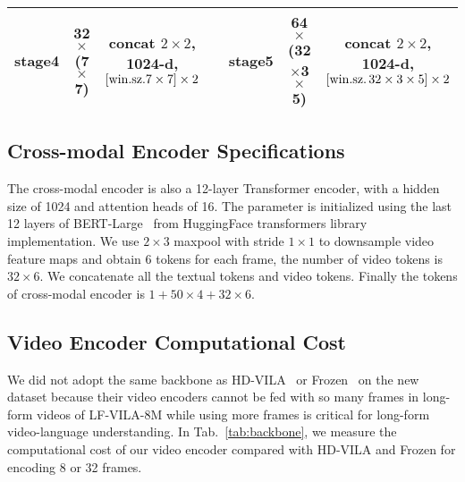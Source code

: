 \documentclass{article}
\begin{document}
\begin{table}[t]
\begin{tabular}{c c c c c c c}
    \cmidrule{1-7}
    
    stage4 &\makecell[c]{32$\times$\\(7$\times$7)} &\makecell[c]{concat $2\times2$, \\1024-d, \\ $[\rm win.sz. 7\times7]\times2$}  
    &
    &stage5 &\makecell[c]{64$\times$\\(32$\times$3$\times$5)}
    &\makecell[c]{concat $2\times2$,\\ 1024-d, \\ $[\rm win.sz.\, 32\times3\times5]\times2$} \\
    
    \bottomrule
\end{tabular}
\end{table}

\subsection{Cross-modal Encoder Specifications}

The cross-modal encoder is also a 12-layer Transformer encoder, with a hidden size of 1024 and attention heads of 16. The parameter is initialized using the last 12 layers of BERT-Large~\cite{Devlin2018bert} from HuggingFace transformers library implementation.
We use $2 \times 3$ maxpool with stride $1 \times 1$ to downsample video feature maps and obtain 6 tokens for each frame, the number of video tokens is $32\times 6$.
We concatenate all the textual tokens and video tokens. Finally the tokens of cross-modal encoder is $1 + 50 \times 4 + 32\times 6$.

\subsection{Video Encoder Computational Cost}
We did not adopt the same backbone as HD-VILA~\cite{xue2021hdvila} or Frozen~\cite{bain2021frozen} on the new dataset because their video encoders cannot be fed with so many frames in long-form videos of LF-VILA-8M  while using more frames is critical for long-form video-language understanding. In Tab.~\ref{tab:backbone}, we measure the computational cost of our video encoder compared with HD-VILA and Frozen for encoding 8 or 32 frames.
\end{document}
